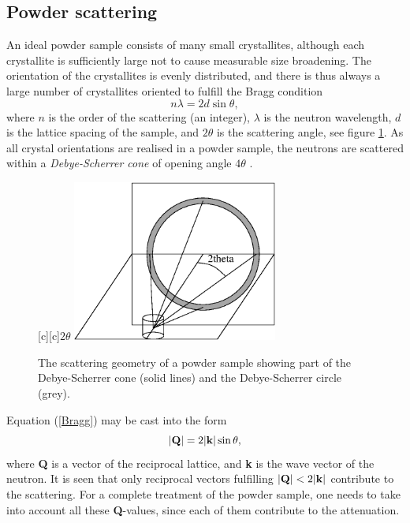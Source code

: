 \subsection{Powder scattering}
An ideal powder sample consists of many small
crystallites, although each crystallite is sufficiently
large not to cause measurable size broadening.
The orientation of the crystallites is evenly distributed,
and there is thus always a large number of
crystallites oriented to fulfill the Bragg condition
\begin{equation}   \label{Bragg}
n \lambda = 2 d \sin \theta ,
\end{equation}
where $n$ is the order of the scattering (an integer), $\lambda$
is the neutron wavelength, $d$ is the lattice spacing of the sample,
and $2 \theta$ is the scattering angle, see figure \ref{coneFig}.
As all crystal orientations
are realised in a powder sample, the neutrons are scattered within a
{\em Debye-Scherrer cone} of opening angle $4 \theta$ \cite{bacon}.

\begin{figure}
  \begin{center}
    [c][c]{$2\theta$}
    \includegraphics[width=0.6\textwidth]{figures/powder.eps}
  \end{center}
\caption{The scattering geometry of a powder sample showing part of the
Debye-Scherrer cone (solid lines) and the Debye-Scherrer circle (grey).}
\label{coneFig}
\end{figure}

Equation (\ref{Bragg}) may be cast into the form
\begin{equation}
|{\bf Q}| = 2 |{\bf k}| \sin \theta ,
\end{equation}
where {\bf Q} is a vector of the reciprocal lattice, and {\bf k} is
the wave vector of the neutron. It is seen that only
reciprocal vectors fulfilling $|{\bf Q}| < 2 |{\bf k}|$
contribute to the scattering.
For a complete treatment of the powder sample, one needs to take
into account all these {\bf Q}-values, since each of them contribute
to the attenuation.

